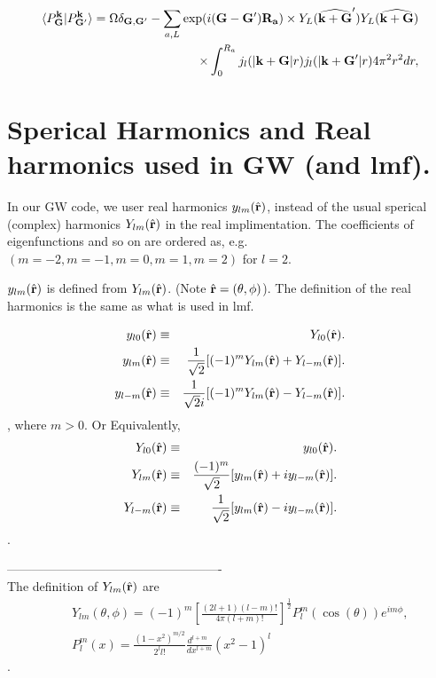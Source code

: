 \documentclass[a4paper,10pt,epsf,fleqn]{article}
\begin{document}
{{{\begin{thebibliography}{00}
\begin{eqnarray}
\langle P^{\bf k}_{\bf G}|P^{\bf k}_{{\bf G}'} \rangle
= \Omega \delta_{{\bf G},{\bf G}'} -  
\sum_{a,L} \exp( i ({\bf G}-{\bf G}') {\bf R_a}) \times Y_L(\widehat{{\bf k+G}}') 
Y_L( {\bf \widehat{ k+G} }) \nonumber \\
\times \int_0^{R_a} j_l(|{\bf k+G}|r)j_l(|{\bf k+G}'|r) 4 \pi^2 r^2 dr,
\end{eqnarray}

\newpage
\section{Sperical Harmonics and Real harmonics used in GW (and lmf).}

In our GW code, we user real harmonics $y_{lm}(\hat{\bf r})$,
instead of the usual sperical (complex) harmonics $Y_{lm}(\hat{\bf r})$
in the real implimentation.
The coefficients of eigenfunctions and so on are ordered as, e.g.
$(m=-2, m=-1, m=0, m=1,m=2)$ for $l=2$.

$y_{lm}(\hat{\bf r})$ is defined from $Y_{lm}(\hat{\bf r})$.
(Note $\hat{\bf r}=(\theta, \phi)$). The definition of the 
real harmonics is the same as what is used in lmf.

\begin{eqnarray}
 y_{l0}(\hat{\bf r}) 
  &\equiv& Y_{l0}(\hat{\bf r}). \\
 y_{lm}(\hat{\bf r}) 
  &\equiv& \frac{1}{\sqrt{2}}
           [ (-1)^m Y_{lm}(\hat{\bf r}) + Y_{l-m}(\hat{\bf r}) ]. \\
 y_{l-m}(\hat{\bf r})
  &\equiv& \frac{1}{\sqrt{2}i}
           [ (-1)^m Y_{lm}(\hat{\bf r}) - Y_{l-m}(\hat{\bf r}) ].
\end{eqnarray}
, where $m>0$. Or Equivalently,
\begin{eqnarray}
 Y_{l0}(\hat{\bf r}) 
  &\equiv& y_{l0}(\hat{\bf r}). \\
 Y_{lm}(\hat{\bf r}) 
  &\equiv& \frac{(-1)^m}{\sqrt{2}}
           [ y_{lm}(\hat{\bf r}) + iy_{l-m}(\hat{\bf r}) ]. \\
 Y_{l-m}(\hat{\bf r})
  &\equiv& \frac{1}{\sqrt{2}}
           [ y_{lm}(\hat{\bf r}) - iy_{l-m}(\hat{\bf r}) ].
\end{eqnarray}.

----------------------------------------------------\\
The definition of $Y_{lm}(\hat{\bf r})$ are
\begin{eqnarray}
&&Y_{lm}(\theta, \phi)
=(-1)^m \left[ \frac{(2l+1)(l-m)!}{4 \pi (l+m)!} \right]^{\frac{1}{2}} P^m_l(\cos(\theta)) e^{i m \phi}, \\
&&P^m_l(x) = \frac{(1-x^2)^{m/2}}{2^l l!}\frac{d^{l+m} \ \ }{dx^{l+m}} (x^2-1)^l
\end{eqnarray}.


\end{thebibliography}}}}
\end{document}

